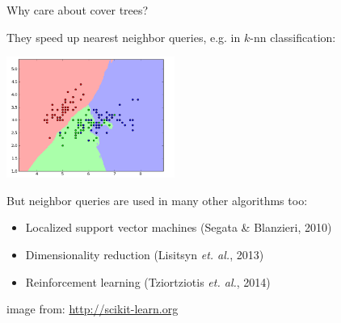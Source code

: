 \begin{frame}[fragile]{Why care about cover trees?}

They speed up nearest neighbor queries, e.g. in
 $k$-nn classification:

\begin{center}
\includegraphics[width=5.5cm]{slides/knn.png}
\end{center}

But neighbor queries are used in many other algorithms too:
\begin{itemize}
\item Localized support vector machines (Segata \& Blanzieri, 2010)
\item Dimensionality reduction (Lisitsyn \emph{et. al.}, 2013)
\item Reinforcement learning (Tziortziotis \emph{et. al.}, 2014)
\end{itemize}

\vspace{0.05in}
{\tiny image from: \url{http://scikit-learn.org}}

\end{frame}

